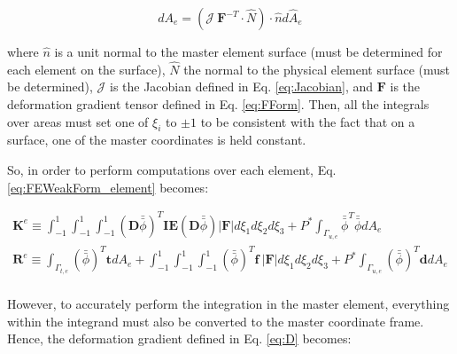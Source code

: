 \documentclass[10pt]{article}
\begin{document}
\begin{equation}
dA_e=(\mathscr{J}\ \textbf{F}^{-T}\cdot\hat{N})\cdot\hat{n}d\hat{A}_e
\end{equation}

where \(\hat{n}\) is a unit normal to the master element surface (must be determined for each element on the surface), \(\hat{N}\) the normal to the physical element surface (must be determined), \(\mathscr{J}\) is the Jacobian defined in Eq. \eqref{eq:Jacobian}, and \(\textbf{F}\) is the deformation gradient tensor defined in Eq. \eqref{eq:FForm}. Then, all the integrals over areas must set one of \(\xi_i\) to \(\pm1\) to be consistent with the fact that on a surface, one of the master coordinates is held constant.








So, in order to perform computations over each element, Eq. \eqref{eq:FEWeakForm_element} becomes:

\begin{equation}
\label{eq:FEWeakForm_element}
\begin{aligned}
\textbf{K}^e\equiv\int_{-1}^{1}\int_{-1}^{1}\int_{-1}^{1}(\textbf{D}\bar{\bar{\phi}})^T\textbf{IE}(\textbf{D}\bar{\bar{\phi}})|\textbf{F}|d\xi_1d\xi_2d\xi_3 +P^{*}\int_{\Gamma_{u,e}}\bar{\bar{\phi}}^T\bar{\bar{\phi}}dA_e\\
\textbf{R}^e\equiv\int_{\Gamma_{t,e}}(\bar{\bar{\phi}})^T\textbf{t}dA_e+\int_{-1}^{1}\int_{-1}^{1}\int_{-1}^{1}(\bar{\bar{\phi}})^T\textbf{f}\ |\textbf{F}|d\xi_1d\xi_2d\xi_3+P^{*}\int_{\Gamma_{u,e}}(\bar{\bar{\phi}})^T\textbf{d}dA_e\\
\end{aligned}
\end{equation}




However, to accurately perform the integration in the master element, everything within the integrand must also be converted to the master coordinate frame. Hence, the deformation gradient defined in Eq. \eqref{eq:D} becomes:
\end{document}
